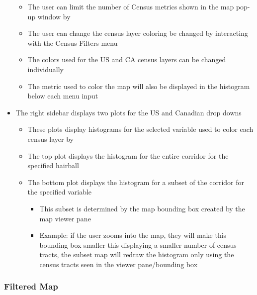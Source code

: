\documentclass[
]{article}
\providecommand{\tightlist}{%
  \setlength{\itemsep}{0pt}\setlength{\parskip}{0pt}}
\begin{document}
\begin{itemize}
  \begin{itemize}
  \tightlist
  \item
    The user can limit the number of Census metrics shown in the map
    pop-up window by
  \item
    The user can change the census layer coloring be changed by
    interacting with the Census Filters menu
  \item
    The colors used for the US and CA census layers can be changed
    individually
  \item
    The metric used to color the map will also be displayed in the
    histogram below each menu input
  \end{itemize}
\item
  The right sidebar displays two plots for the US and Canadian drop
  downs

  \begin{itemize}
  \tightlist
  \item
    These plots display histograms for the selected variable used to
    color each census layer by
  \item
    The top plot displays the histogram for the entire corridor for the
    specified hairball
  \item
    The bottom plot displays the histogram for a subset of the corridor
    for the specified variable

    \begin{itemize}
    \tightlist
    \item
      This subset is determined by the map bounding box created by the
      map viewer pane
    \item
      Example: if the user zooms into the map, they will make this
      bounding box smaller this displaying a smaller number of census
      tracts, the subset map will redraw the histogram only using the
      census tracts seen in the viewer pane/bounding box
    \end{itemize}
  \end{itemize}
\end{itemize}

\hypertarget{filtered-map}{%
\subsubsection{Filtered Map}\label{filtered-map}}
\end{document}
